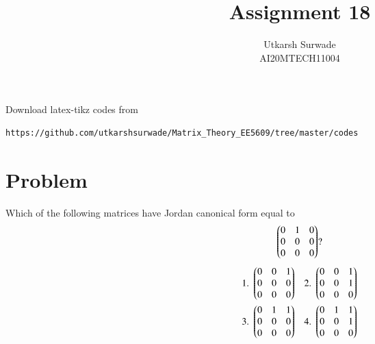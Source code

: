 \documentclass[journal,12pt]{IEEEtran}
\begin{document}
\def\putbox#1#2#3{\makebox[0in][l]{\makebox[#1][l]{}\raisebox{\baselineskip}[0in][0in]{\raisebox{#2}[0in][0in]{#3}}}}
     \def\rightbox#1{\makebox[0in][r]{#1}}
     \def\centbox#1{\makebox[0in]{#1}}
     \def\topbox#1{\raisebox{-\baselineskip}[0in][0in]{#1}}
     \def\midbox#1{\raisebox{-0.5\baselineskip}[0in][0in]{#1}}
\vspace{3cm}
\title{Assignment 18}
\author{Utkarsh Surwade\\AI20MTECH11004}
\maketitle
\bigskip
\renewcommand{\thefigure}{\theenumi}
\renewcommand{\thetable}{\theenumi}
Download latex-tikz codes from 
%
\begin{lstlisting}
https://github.com/utkarshsurwade/Matrix_Theory_EE5609/tree/master/codes
\end{lstlisting}
%
 
\section{\textbf{Problem}}
Which of the following matrices have Jordan canonical form equal to
\begin{align*}
        \begin{pmatrix}0&1&0\\0&0&0\\0&0&0\end{pmatrix}?
\end{align*}
\begin{align*}
    \mbox{1. }\begin{pmatrix}0&0&1\\0&0&0\\0&0&0\end{pmatrix}&&\mbox{2. }\begin{pmatrix}0&0&1\\0&0&1\\0&0&0\end{pmatrix}\\
    \mbox{3. }\begin{pmatrix}0&1&1\\0&0&0\\0&0&0\end{pmatrix}&&\mbox{4. }\begin{pmatrix}0&1&1\\0&0&1\\0&0&0\end{pmatrix}
\end{align*}

\newpage
\end{document}
